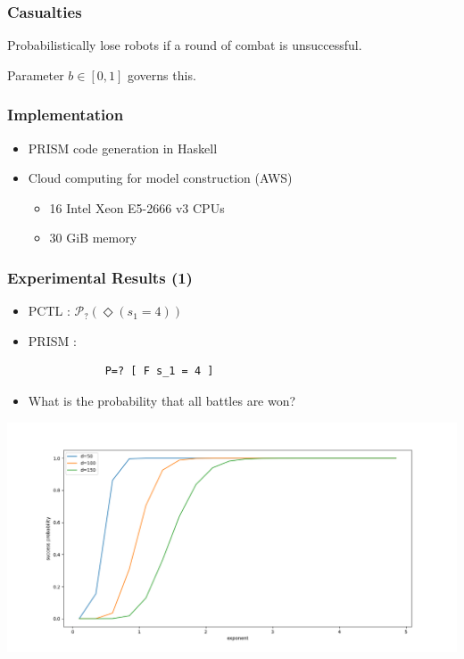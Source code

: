 \documentclass{beamer}
\theoremstyle{definition}
\begin{document}
\begin{frame}
    \frametitle{Casualties}

    Probabilistically lose robots if a round of combat is unsuccessful.
    
    Parameter $ b \in [0, 1] $ governs this.
\end{frame}

\begin{frame}
    \frametitle{Implementation}

    \begin{itemize}
        \item PRISM code generation in Haskell
        \item Cloud computing for model construction (AWS)
            \begin{itemize}
                \item 16 Intel Xeon E5-2666 v3 CPUs
                \item 30 GiB memory
            \end{itemize}
    \end{itemize}
\end{frame}

\begin{frame}[fragile]
    \frametitle{Experimental Results (1)}
    \scriptsize

    \begin{itemize}
        \item PCTL : $ \mathcal{P}_{?} (\Diamond (s_1 = 4)) $
        \item 
            PRISM : 
            \begin{lstlisting} 
            P=? [ F s_1 = 4 ] 
            \end{lstlisting}
        \item What is the probability that all battles are won?
    \end{itemize}
    \includegraphics[width=\textwidth]{../figs/fig1.png}
\end{frame}
\end{document}
